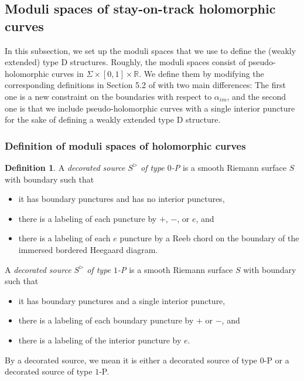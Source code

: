 \documentclass{amsart}
\theoremstyle{definition}
\newtheorem{defn}[thm]{Definition}
\theoremstyle{remark}
\numberwithin{equation}{section}
\numberwithin{equation}{section} \makeatletter
\begin{document}
\subsection{Moduli spaces of stay-on-track holomorphic curves} \label{subsection, defining moduli spaces}
In this subsection, we set up the moduli spaces that we use to define the (weakly extended) type D structures. Roughly, the moduli spaces consist of pseudo-holomorphic curves in $\Sigma\times [0,1]\times \mathbb{R}$. We define them by modifying the corresponding definitions in Section 5.2 of \cite{LOT18} with two main differences: The first one is a new constraint on the boundaries with respect to $\alpha_{im}$, and the second one is that we include pseudo-holomorphic curves with a single interior puncture for the sake of defining a weakly extended type D structure. 

\subsubsection{Definition of moduli spaces of holomorphic curves} 
\begin{defn}\label{Definition, decorated sources}
A \emph{decorated source $S^\triangleright$ of type $0$-P} is a smooth Riemann surface $S$ with boundary such that
\begin{itemize}
\item[(1)]it has boundary punctures and has no interior punctures, 
\item[(2)]there is a labeling of each puncture by $+$, $-$, or $e$, and
\item[(3)]there is a labeling of each $e$ puncture by a Reeb chord on the boundary of the immersed bordered Heegaard diagram. 
\end{itemize}
A \emph{decorated source $S^\triangleright$ of type $1$-P} is a smooth Riemann surface $S$ with boundary such that 
\begin{itemize}
\item[(1)]it has boundary punctures and a single interior puncture,
\item[(2)]there is a labeling of each boundary puncture by $+$ or $-$, and
\item[(3)]there is a labeling of the interior puncture by $e$.
\end{itemize}
By a decorated source, we mean it is either a decorated source of type $0$-P or a decorated source of type $1$-P.
\end{defn}
\end{document}
